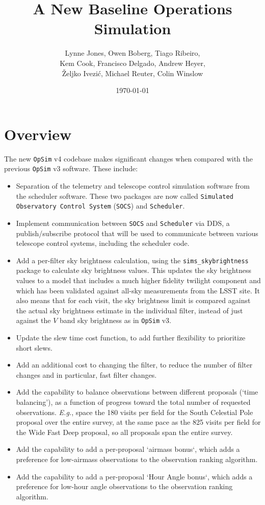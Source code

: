 \documentclass[DM,lsstdraft,authoryear,toc]{lsstdoc}
\title{A New Baseline Operations Simulation}
\author{%
Lynne Jones,
Owen Boberg,
Tiago Ribeiro, \\
Kem Cook,
Francisco Delgado,
Andrew Heyer, \\
\v{Z}eljko Ivezi\'{c},
Michael Reuter,
Colin Winslow
}
\date{\today}
\newcommand{\opsim}{\texttt{OpSim}\xspace}
\newcommand{\socs}{\texttt{SOCS}\xspace}
\newcommand{\sched}{\texttt{Scheduler}\xspace}
\newcommand{\simsky}{\texttt{sims\_skybrightness}\xspace}
\begin{document}
\maketitle

\section{Overview}

The new \opsim v4 codebase makes significant changes when compared with the previous \opsim v3 software. These include:
\begin{itemize}
\item Separation of the telemetry and telescope control simulation software from the scheduler software. These two packages are now called \texttt{Simulated Observatory Control System} (\socs) and \texttt{Scheduler}.
\item Implement communication between \socs and \sched via DDS, a publish/subscribe protocol that will be used to communicate between various telescope control systems, including the scheduler code.
\item Add a per-filter sky brightness calculation, using the \simsky package to calculate sky brightness values. This updates the sky brightness values to a model that includes a much higher fidelity twilight component and which has been validated against all-sky measurements from the LSST site. It also means that for each visit, the sky brightness limit is compared against the actual sky brightness estimate in the individual filter, instead of just against the $V$ band sky brightness as in \opsim v3.
\item Update the slew time cost function, to add further flexibility to prioritize short slews.
\item Add an additional cost to changing the filter, to reduce the number of filter changes and in particular, fast filter changes.
\item Add the capability to balance observations between different proposals (`time balancing'), as a function of progress toward the total number of requested observations. {\it E.g.}, space the 180 visits per field for the South Celestial Pole proposal over the entire survey, at the same pace as the 825 visits per field for the Wide Fast Deep proposal, so all proposals span the entire survey.
\item Add the capability to add a per-proposal `airmass bonus`, which adds a preference for low-airmass observations to the observation ranking algorithm.
\item Add the capability to add a per-proposal `Hour Angle bonus`, which adds a preference for low-hour angle observations to the observation ranking algorithm.
\end{itemize}
\end{document}
